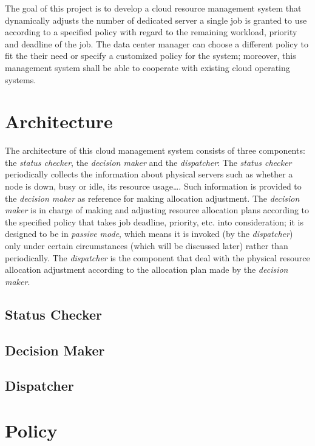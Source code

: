 \documentclass[11pt]{article}
\begin{document}
The goal of this project is to develop a cloud resource management
system that dynamically adjusts the number of dedicated server a single
job is granted to use according to a specified policy with regard to the
remaining workload, priority and deadline of the job. The data center
manager can choose a different policy to fit the their need or specify a
customized policy for the system; moreover, this management system shall
be able to cooperate with existing cloud operating systems.


\section{Architecture}


The architecture of this cloud management system consists of three
components: the \emph{status checker}, the \emph{decision maker} and the
\emph{dispatcher}:  The \emph{status checker} periodically collects the
information about physical servers such as whether a node is down, busy
or idle, its resource usage\ldots.  Such information is provided to the
\emph{decision maker} as reference for making allocation adjustment.
The \emph{decision maker} is in charge of making and adjusting resource
allocation plans according to the specified policy that takes job
deadline, priority, etc. into consideration; it is designed to be in
\emph{passive mode}, which means it is invoked (by the
\emph{dispatcher}) only under certain circumstances (which will be
discussed later) rather than periodically.  The \emph{dispatcher} is the
component that deal with the physical resource allocation adjustment
according to the allocation plan made by the \emph{decision maker}.

\subsection{Status Checker}

\subsection{Decision Maker}

\subsection{Dispatcher}

\section{Policy}

\renewcommand\refname{Reference}


\end{document}
